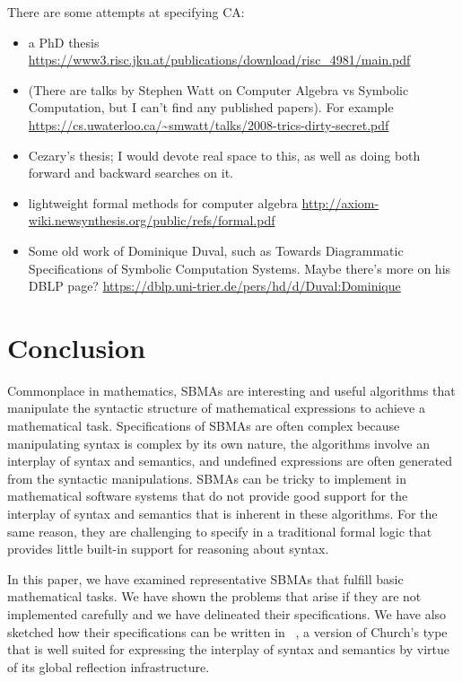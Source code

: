 \documentclass[fleqn]{llncs}
\begin{document}
There are some attempts at specifying CA:
\begin{itemize}
\item a PhD thesis 
\url{https://www3.risc.jku.at/publications/download/risc_4981/main.pdf}
\item (There are talks by Stephen Watt on Computer Algebra vs Symbolic
Computation, but I can't find any published papers). For example
\url{https://cs.uwaterloo.ca/~smwatt/talks/2008-trics-dirty-secret.pdf}
\item Cezary's thesis; I would devote real space to this, as well as doing
both forward and backward searches on it.
\item lightweight formal methods for computer algebra
\url{http://axiom-wiki.newsynthesis.org/public/refs/formal.pdf}
\item Some old work of Dominique Duval, such as
Towards Diagrammatic Specifications of Symbolic Computation Systems.
Maybe there's more on his DBLP page?
\url{https://dblp.uni-trier.de/pers/hd/d/Duval:Dominique}
\end{itemize}

\fi

\section{Conclusion}\label{sec:conclusion}

Commonplace in mathematics, SBMAs are interesting and useful
algorithms that manipulate the syntactic structure of mathematical
expressions to achieve a mathematical task.  Specifications of SBMAs
are often complex because manipulating syntax is complex by its own
nature, the algorithms involve an interplay of syntax and semantics,
and undefined expressions are often generated from the syntactic
manipulations.  SBMAs can be tricky to implement in mathematical
software systems that do not provide good support for the interplay of
syntax and semantics that is inherent in these algorithms.  For the
same reason, they are challenging to specify in a traditional formal
logic that provides little built-in support for reasoning about
syntax.

In this paper, we have examined representative SBMAs that fulfill
basic mathematical tasks.  We have shown the problems that arise if
they are not implemented carefully and we have delineated their
specifications.  We have also sketched how their specifications can be
written in {\churchuqe}~\cite{Farmer17}, a version of Church's type
that is well suited for expressing the interplay of syntax and
semantics by virtue of its global reflection infrastructure.
\end{document}
